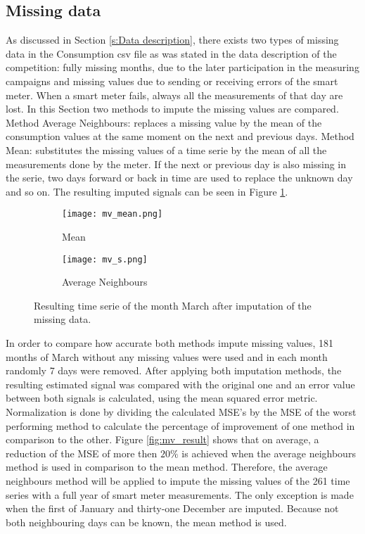 \subsection{Missing data} \label{s:missing_data}
As discussed in Section \ref{s:Data description}, there exists two types of missing data in the Consumption csv file as was stated in the data description of the competition: fully missing months, due to the later participation in the measuring campaigns and missing values due to sending or receiving errors of the smart meter. When a smart meter fails, always all the measurements of that day are lost. In this Section two methods to impute the missing values are compared. Method Average Neighbours: replaces a missing value by the mean of the consumption values at the same moment on the next and previous days. Method Mean: substitutes the missing values of a time serie by the mean of all the measurements done by the meter. If the next or previous day is also missing in the serie, two days forward or back in time are used to replace the unknown day and so on. The resulting imputed signals can be seen in Figure \ref{fig:missing_values_imputing}. \\

\begin{figure}[h]
	\begin{subfigure}{0.5\textwidth}
		\texttt{[image: mv\_mean.png]}
		\caption{Mean}
	\end{subfigure}	
	\begin{subfigure}{0.5\textwidth}
		\texttt{[image: mv\_s.png]}
		\caption{Average Neighbours}
	\end{subfigure}
	\caption{Resulting time serie of the month March after imputation of the missing data.}
	\label{fig:missing_values_imputing}
\end{figure}

In order to compare how accurate both methods impute missing values, 181 months of March without any missing values were used and in each month randomly 7 days were removed. After applying both imputation methods, the resulting estimated signal was compared with the original one and an error value between both signals is calculated, using the mean squared error metric. Normalization is done by dividing the calculated MSE's by the MSE of the worst performing method to calculate the percentage of improvement of one method in comparison to the other. Figure \ref{fig:mv_result} shows that on average, a reduction of the MSE of more then $ 20\% $ is achieved when the average neighbours method is used in comparison to the mean method. Therefore, the average neighbours method will be applied to impute the missing values of the 261 time series with a full year of smart meter measurements. The only exception is made when the first of January and thirty-one December are imputed. Because not both neighbouring days can be known, the mean method is used.

